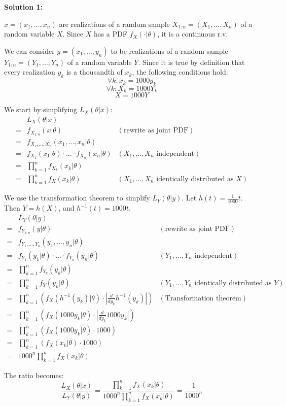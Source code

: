 \documentclass{article}
\begin{document}
\textbf{Solution 1:}
\begin{ssolution}
\(x=(x_1,\ldots,x_n)\) are realizations of a random sample \(X_{1:n}=(X_1,\ldots,X_n)\) of a random variable \(X\).
Since \(X\) has a PDF \(f_X(\cdot|\theta)\), it is a continuous r.v.

We can consider \(y=(x_1,\ldots, y_n)\) to be realizations of a random sample \(Y_{1:n}=(Y_1,\ldots, Y_n)\)
of a random variable \(Y\).
Since it is true by definition that every realization \(y_k\) is a thousandth of \(x_k\), the following conditions hold:
\[\forall k: x_k = 1000y_k\]
\[\forall k: X_k = 1000Y_k\]
\[X = 1000Y\]

We start by simplifying \(L_X(\theta|x)\):
\begin{align*}
	 & L_X(\theta|x) \\
	=& f_{X_{1:n}}(x|\theta) & (\text{rewrite as joint PDF}) \\
	=& f_{X_1,\ldots,X_n}(x_1,\ldots,x_n|\theta) \\
	=& f_{X_1}(x_1|\theta)\cdot \ldots \cdot f_{X_n}(x_n|\theta) & (X_1,\ldots,X_n \text{ independent}) \\
	=& \prod_{k=1}^n f_{X_k}(x_k|\theta) \\
	=& \prod_{k=1}^n f_X(x_k|\theta) & (X_1,\ldots,X_n\text{ identically distributed as \(X\)})
\end{align*}

We use the transformation theorem to simplify \(L_Y(\theta|y)\).
Let \(h(t) = \frac{1}{1000}t\).
Then \(Y=h(X)\), and \(h^{-1}(t) = 1000t\).
\begin{align*}
	 & L_Y(\theta|y) \\
	=& f_{Y_{1:n}}(y|\theta) & (\text{rewrite as joint PDF}) \\
	=& f_{Y_1,\ldots,Y_n}(y_1,\ldots,y_n|\theta) \\
	=& f_{Y_1}(y_1|\theta)\cdot \ldots \cdot f_{Y_n}(y_n|\theta) & (Y_1,\ldots,Y_n \text{ independent}) \\
	=& \prod_{k=1}^n f_{Y_k}(y_k|\theta) \\
	=& \prod_{k=1}^n f_Y(y_k|\theta) & (Y_1,\ldots, Y_n\text{ identically distributed as \(Y\)}) \\
	=& \prod_{k=1}^n \left( f_X(h^{-1}(y_k)|\theta) \cdot \left|\frac{d}{dy_k}h^{-1}(y_k)\right| \right) & (\text{Transformation theorem}) \\
	=& \prod_{k=1}^n \left( f_X(1000y_k|\theta) \cdot \left|\frac{d}{dy_k}1000y_k\right| \right) \\
	=& \prod_{k=1}^n \left( f_X(1000y_k|\theta) \cdot 1000 \right) \\
	=& \prod_{k=1}^n \left( f_X(x_k|\theta) \cdot 1000 \right) \\
	=& 1000^n\prod_{k=1}^n f_X(x_k|\theta)
\end{align*}

The ratio becomes:
\[\frac{L_X(\theta|x)}{L_Y(\theta|y)} = \frac{\prod_{k=1}^n f_X(x_k|\theta)}{1000^n\prod_{k=1}^n f_X(x_k|\theta)} = \frac{1}{1000^n} \]
\end{ssolution}
\end{document}
